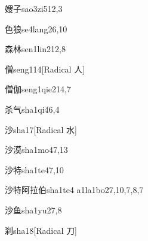 \begin{verbete}{嫂子}{sao3zi5}{12,3}
\end{verbete}

\begin{verbete}{色狼}{se4lang2}{6,10}
\end{verbete}

\begin{verbete}{森林}{sen1lin2}{12,8}
\end{verbete}

\begin{verbete}{僧}{seng1}{14}[Radical 人]
\end{verbete}

\begin{verbete}{僧伽}{seng1qie2}{14,7}
\end{verbete}

\begin{verbete}{杀气}{sha1qi4}{6,4}
\end{verbete}

\begin{verbete}{沙}{sha1}{7}[Radical 水]
\end{verbete}

\begin{verbete}{沙漠}{sha1mo4}{7,13}
\end{verbete}

\begin{verbete}{沙特}{sha1te4}{7,10}
\end{verbete}

\begin{verbete}{沙特阿拉伯}{sha1te4 a1la1bo2}{7,10,7,8,7}
\end{verbete}

\begin{verbete}{沙鱼}{sha1yu2}{7,8}
\end{verbete}

\begin{verbete}{刹}{sha1}{8}[Radical 刀]
\end{verbete}

